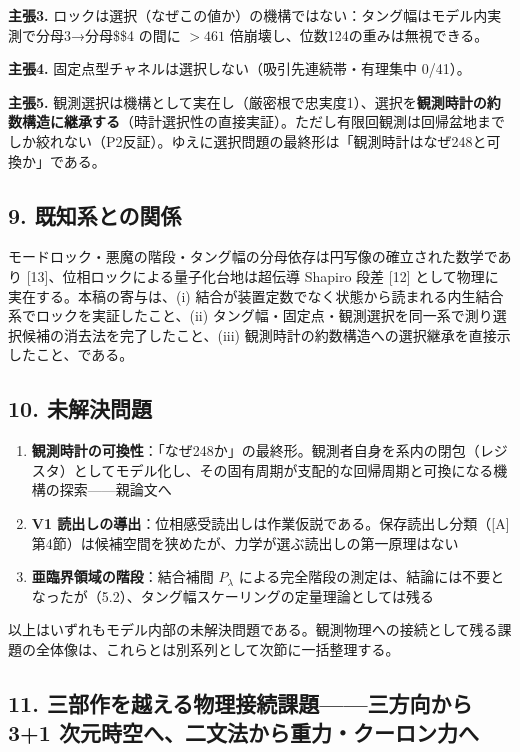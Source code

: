 \documentclass[
  a4paper,
]{ltjsarticle}
\providecommand{\tightlist}{%
  \setlength{\itemsep}{0pt}\setlength{\parskip}{0pt}}
\begin{document}
\textbf{主張3.}
ロックは選択（なぜこの値か）の機構ではない：タング幅はモデル内実測で分母3→分母\$\ge\$4
の間に \(>461\) 倍崩壊し、位数124の重みは無視できる。

\textbf{主張4.} 固定点型チャネルは選択しない（吸引先連続帯・有理集中
0/41）。

\textbf{主張5.}
観測選択は機構として実在し（厳密根で忠実度1）、選択を\textbf{観測時計の約数構造に継承する}（時計選択性の直接実証）。ただし有限回観測は回帰盆地までしか絞れない（P2反証）。ゆえに選択問題の最終形は「観測時計はなぜ248と可換か」である。

\subsection{9.
既知系との関係}\label{ux65e2ux77e5ux7cfbux3068ux306eux95a2ux4fc2}

モードロック・悪魔の階段・タング幅の分母依存は円写像の確立された数学であり
{[}13{]}、位相ロックによる量子化台地は超伝導 Shapiro 段差 {[}12{]}
として物理に実在する。本稿の寄与は、(i)
結合が装置定数でなく状態から読まれる内生結合系でロックを実証したこと、(ii)
タング幅・固定点・観測選択を同一系で測り選択候補の消去法を完了したこと、(iii)
観測時計の約数構造への選択継承を直接示したこと、である。

\subsection{10. 未解決問題}\label{ux672aux89e3ux6c7aux554fux984c}

\begin{enumerate}
\def\labelenumi{\arabic{enumi}.}
\tightlist
\item
  \textbf{観測時計の可換性}：「なぜ248か」の最終形。観測者自身を系内の閉包（レジスタ）としてモデル化し、その固有周期が支配的な回帰周期と可換になる機構の探索------親論文へ
\item
  \textbf{V1
  読出しの導出}：位相感受読出しは作業仮説である。保存読出し分類（{[}A{]}
  第4節）は候補空間を狭めたが、力学が選ぶ読出しの第一原理はない
\item
  \textbf{亜臨界領域の階段}：結合補間 \(P_\lambda\)
  による完全階段の測定は、結論には不要となったが（5.2）、タング幅スケーリングの定量理論としては残る
\end{enumerate}

以上はいずれもモデル内部の未解決問題である。観測物理への接続として残る課題の全体像は、これらとは別系列として次節に一括整理する。

\subsection{11. 三部作を越える物理接続課題------三方向から 3+1
次元時空へ、二文法から重力・クーロン力へ}\label{ux4e09ux90e8ux4f5cux3092ux8d8aux3048ux308bux7269ux7406ux63a5ux7d9aux8ab2ux984cux4e09ux65b9ux5411ux304bux3089-31-ux6b21ux5143ux6642ux7a7aux3078ux4e8cux6587ux6cd5ux304bux3089ux91cdux529bux30afux30fcux30edux30f3ux529bux3078}
\end{document}
